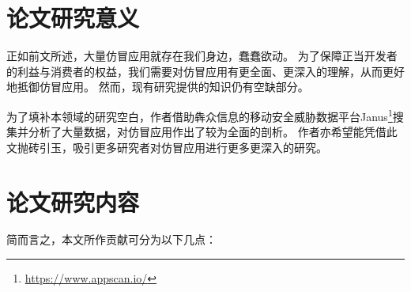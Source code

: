 \section{论文研究意义}

正如前文所述，大量仿冒应用就存在我们身边，蠢蠢欲动。
为了保障正当开发者的利益与消费者的权益，我们需要对仿冒应用有更全面、更深入的理解，从而更好地抵御仿冒应用。
然而，现有研究提供的知识仍有空缺部分。

为了填补本领域的研究空白，作者借助犇众信息的移动安全威胁数据平台Janus\footnote{\url{https://www.appscan.io/}}搜集并分析了大量数据，对仿冒应用作出了较为全面的剖析。
作者亦希望能凭借此文抛砖引玉，吸引更多研究者对仿冒应用进行更多更深入的研究。


\section{论文研究内容}
简而言之，本文所作贡献可分为以下几点：
